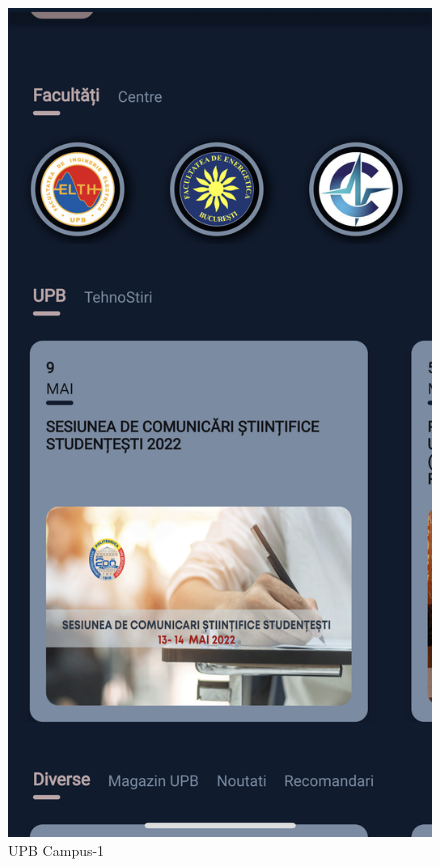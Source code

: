 \begin{figure}[!ht]
\begin{minipage}[b]{0.24\textwidth}
        \includegraphics[width=\textwidth]{figures/app/miscellanous/upb-campus-1.png}
        \caption{UPB Campus-1}
        \label{4:fig:upb-campus-1}
    \end{minipage}
    \hfill
    \begin{minipage}[b]{0.23\textwidth}
        \captionsetup{justification=centering}

\end{minipage}
\end{figure}

